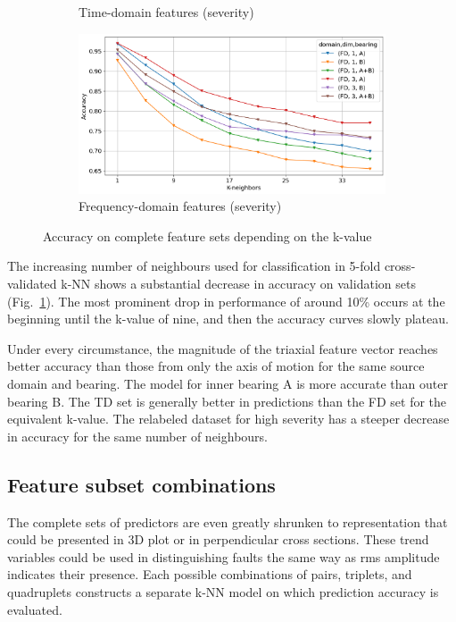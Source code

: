 \begin{figure}[h]
\begin{subfigure}[b]{0.48\textwidth}
        \caption{Time-domain features (severity)}
    \end{subfigure}
    \hfill
    \begin{subfigure}[b]{0.48\textwidth}
        \includegraphics[width=\textwidth]{assets/results/all-features/FD-severity.png}
        \caption{Frequency-domain features (severity)}
    \end{subfigure} 
    \caption{Accuracy on complete feature sets depending on the k-value}
    \label{fig:evaluation:complete-set-k-value}
\end{figure}

The increasing number of neighbours used for classification in 5-fold cross-validated k-NN shows a substantial decrease in accuracy on validation sets (Fig.~\ref{fig:evaluation:complete-set-k-value}). The most prominent drop in performance of around 10\% occurs at the beginning until the k-value of nine, and then the accuracy curves slowly plateau.

Under every circumstance, the magnitude of the triaxial feature vector reaches better accuracy than those from only the axis of motion for the same source domain and bearing. The model for inner bearing A is more accurate than outer bearing B. The TD set is generally better in predictions than the FD set for the equivalent k-value. The relabeled dataset for high severity has a steeper decrease in accuracy for the same number of neighbours.

\subsection{Feature subset combinations}
The complete sets of predictors are even greatly shrunken to representation that could be presented in 3D plot or in perpendicular cross sections. These trend variables could be used in distinguishing faults the same way as rms amplitude indicates their presence. Each possible combinations of pairs, triplets, and quadruplets constructs a separate k-NN model on which prediction accuracy is evaluated. 

